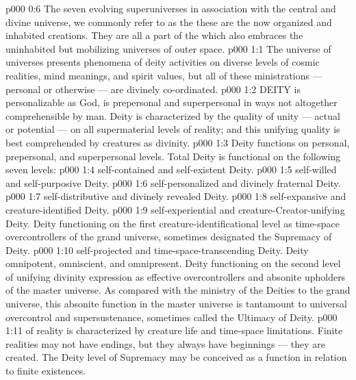 \vs p000 0:6 The seven evolving superuniverses in association with the central and divine universe, we commonly refer to as the  these are the now organized and inhabited creations. They are all a part of the  which also embraces the uninhabited but mobilizing universes of outer space.
\vs p000 1:1 The universe of universes presents phenomena of deity activities on diverse levels of cosmic realities, mind meanings, and spirit values, but all of these ministrations --- personal or otherwise --- are divinely co\hyp{}ordinated.
\vs p000 1:2 \pc DEITY is personalizable as God, is prepersonal and superpersonal in ways not altogether comprehensible by man. Deity is characterized by the quality of unity --- actual or potential --- on all supermaterial levels of reality; and this unifying quality is best comprehended by creatures as divinity.
\vs p000 1:3 \pc Deity functions on personal, prepersonal, and superpersonal levels. Total Deity is functional on the following seven levels:
\vs p000 1:4 \bibnobreakspace {} self\hyp{}contained and self\hyp{}existent Deity.
\vs p000 1:5 \bibnobreakspace {} self\hyp{}willed and self\hyp{}purposive Deity.
\vs p000 1:6 \bibnobreakspace {} self\hyp{}personalized and divinely fraternal Deity.
\vs p000 1:7 \bibnobreakspace {} self\hyp{}distributive and divinely revealed Deity.
\vs p000 1:8 \bibnobreakspace {} self\hyp{}expansive and creature\hyp{}identified Deity.
\vs p000 1:9 \bibnobreakspace {} self\hyp{}experiential and creature\hyp{}Creator\hyp{}unifying Deity. Deity functioning on the first creature\hyp{}identificational level as time\hyp{}space overcontrollers of the grand universe, sometimes designated the Supremacy of Deity.
\vs p000 1:10 \bibnobreakspace {} self\hyp{}projected and time\hyp{}space\hyp{}transcending Deity. Deity omnipotent, omniscient, and omnipresent. Deity functioning on the second level of unifying divinity expression as effective overcontrollers and absonite upholders of the master universe. As compared with the ministry of the Deities to the grand universe, this absonite function in the master universe is tantamount to universal overcontrol and supersustenance, sometimes called the Ultimacy of Deity.
\vs p000 1:11 \pc {} of reality is characterized by creature life and time\hyp{}space limitations. Finite realities may not have endings, but they always have beginnings --- they are created. The Deity level of Supremacy may be conceived as a function in relation to finite existences.
